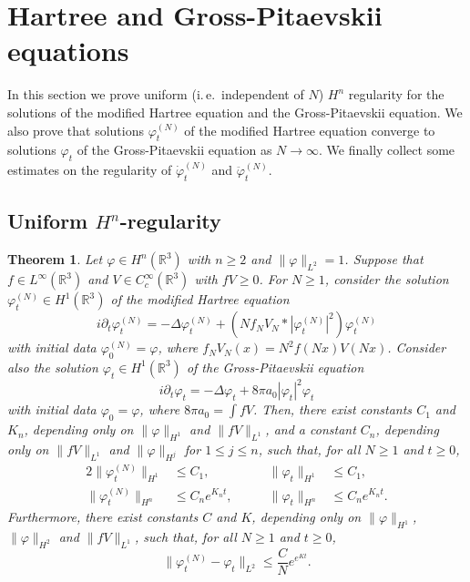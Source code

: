 \documentclass[11pt,a4paper,DIV11]{scrartcl}	%
\newtheorem{thm}{Theorem}[section]
\newcommand{\R}{\mathds{R}}
\newcommand{\ph}{\varphi_t^{(N)}}	%
\newcommand{\phdot}{\dot{\varphi}_t^{(N)}}	%
\newcommand{\phddot}{\ddot{\varphi}_t^{(N)}}	%
\begin{document}
\section{Hartree and Gross-Pitaevskii equations}
\label{s:pde}

In this section we prove uniform (i.\,e.\ independent of $N$) $H^n$
regularity for the solutions of the modified Hartree equation and the
Gross-Pitaevskii equation. We also prove that solutions $\varphi_t^{(N)}$ of
the modified Hartree equation converge to solutions $\varphi_t$ of the
Gross-Pitaevskii equation as $N \to \infty$. We finally collect some
estimates on the regularity of $\phdot$ and $\phddot$.


\subsection{Uniform $H^n$-regularity}
\label{ss:regularity}


\begin{thm} \label{t:pdes}%
  Let $\varphi \in H^n(\R^3)$ with $n \ge 2$ and $\| \varphi \|_{L^2} = 1$.
  Suppose that $f \in L^\infty(\R^3)$ and $V \in C_c^\infty(\R^3)$ with $fV \ge
  0$. For $N \ge 1$, consider the solution $\ph \in H^1(\R^3)$ of the
  modified Hartree equation
  \[
    i \partial_t \varphi_t^{(N)} = - \Delta \varphi_t^{(N)} + (N f_N V_N *
    |\varphi_t^{(N)}|^2) \varphi_t^{(N)}
  \]
  with initial data $\varphi^{(N)}_0 = \varphi$, where $f_N V_N(x) = N^2
  f(Nx)V(Nx)$. Consider also the solution $\varphi_t \in H^1(\R^3)$ of the
  Gross-Pitaevskii equation
  \[
    i \partial_t \varphi_t = - \Delta \varphi_t + 8 \pi a_0 |\varphi_t|^2
    \varphi_t
  \]
  with initial data $\varphi_0 = \varphi$, where $8 \pi a_0 = \int f V$.
  Then, there exist constants $C_1$ and $K_n$, depending only on $\| \varphi
  \|_{H^1}$ and $\| fV \|_{L^1}$, and a constant $C_n$, depending only on
  $\| fV \|_{L^1}$ and $\| \varphi \|_{H^j}$ for $1 \le j \le n$, such that,
  for all $N \ge 1$ and $t \ge 0$,
  \begin{alignat}{2}
    \| \varphi_t^{(N)} \|_{H^1} & \le C_1, & \qquad \| \varphi_t \|_{H^1} &
    \le C_1, \tag{i} \label{H1} \\
    \| \varphi_t^{(N)} \|_{H^n} & \le C_n e^{K_n t}, & \qquad \| \varphi_t
    \|_{H^n} & \le C_n e^{K_n t}. \tag{ii}
  \end{alignat}
  Furthermore, there exist constants $C$ and $K$, depending only on $\|
  \varphi \|_{H^1}$, $\| \varphi \|_{H^2}$ and $\| fV \|_{L^1}$, such that,
  for all $N \geq 1$ and $t \geq 0$,
  \begin{equation}
    \| \varphi_t^{(N)} - \varphi_t \|_{L^2} \le \frac{C}{N} e^{e^{K t}}.
    \tag{iii}
  \end{equation}
\end{thm}
\end{document}
